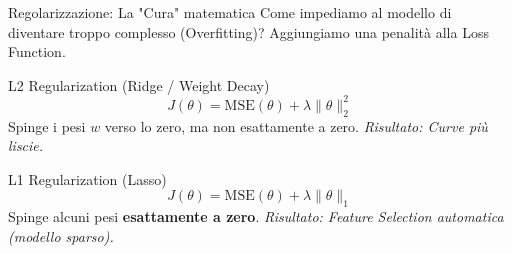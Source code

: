 \documentclass[aspectratio=169, 10pt]{beamer}
\begin{document}
\begin{frame}{Regolarizzazione: La "Cura" matematica}
    Come impediamo al modello di diventare troppo complesso (Overfitting)?
    Aggiungiamo una penalità alla Loss Function.
    
    \begin{block}{L2 Regularization (Ridge / Weight Decay)}
        \[ J(\theta) = \text{MSE}(\theta) + \lambda \|\theta\|_2^2 \]
        Spinge i pesi $w$ verso lo zero, ma non esattamente a zero.
        \small \emph{Risultato: Curve più liscie.}
    \end{block}

    \begin{block}{L1 Regularization (Lasso)}
        \[ J(\theta) = \text{MSE}(\theta) + \lambda \|\theta\|_1 \]
        Spinge alcuni pesi \textbf{esattamente a zero}.
        \small \emph{Risultato: Feature Selection automatica (modello sparso).}
    \end{block}
\end{frame}
\end{document}
